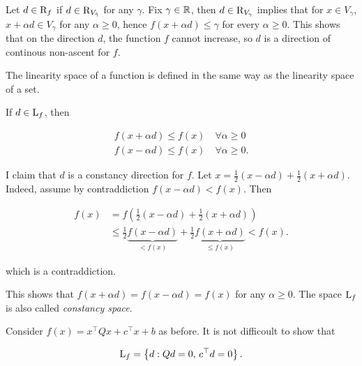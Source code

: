 \begin{remark}
    
    Let $d \in \mathrm{R}_{f}$ if $d \in \mathrm{R}_{V_{\bar{\gamma}}}$ for any $\gamma$. Fix $\gamma \in \mathbb{R}$, then $d \in \mathrm{R}_{V_\gamma}$ implies that for $x \in V_{\gamma}$, $x + \alpha d \in V_\gamma$ for any $\alpha \geq 0$, hence $f(x + \alpha d) \le \gamma$ for every $\alpha \geq 0$. This shows that on the direction $d$, the function $f$ cannot increase, so $d$ is a direction of continous non-ascent for $f$.

\end{remark}

\begin{definition}

    The linearity space of a function is defined in the same way as the linearity space of a set.
    
\end{definition}

\begin{remark}
    
    If $d \in \mathrm{L}_{f}$, then 

    \begin{align*}
        f(x + \alpha d) \le f(x) \quad \forall \alpha \ge 0 \\
        f(x - \alpha d) \le f(x) \quad \forall \alpha \ge 0.
    \end{align*}

    I claim that $d$ is a constancy direction for $f$. Let $x = \frac12 (x - \alpha d) + \frac12 (x + \alpha d)$. Indeed, assume by contraddiction $f(x - \alpha d) < f(x)$. Then 
    
    \begin{align*}
        f(x) &= f\left(\frac12 (x - \alpha d) + \frac12 (x + \alpha d)\right) \\
            &\le \frac12 \underbrace{f(x - \alpha d)}_{< f(x)} + \frac12 \underbrace{f(x + \alpha d)}_{\le f(x)} < f(x).
    \end{align*}

    which is a contraddiction.

    This shows that $f(x + \alpha d) = f(x - \alpha d) = f(x)$ for any $\alpha \ge 0$. The space $\mathrm{L}_{f}$ is also called \emph{constancy space}.

\end{remark}

\begin{example}
    
    Consider $f(x)= x^\top Q x + c^\top x + b$ as before. It is not difficoult to show that 

    \[ \mathrm{L}_{f} = \left\{ d : Qd = 0,\, c^\top d = 0 \right\}. \]

\end{example}

